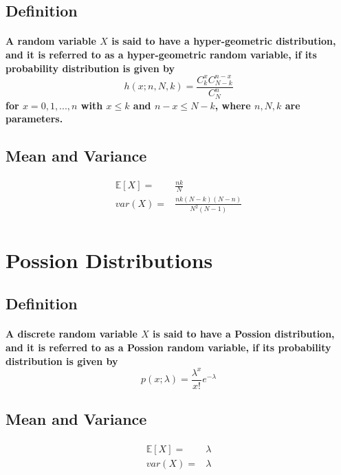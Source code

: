 \documentclass[titlepage]{article}
\begin{document}
        \subsection*{Definition}
            \paragraph{
                A random variable $X$ is said to have a hyper-geometric distribution, and it is referred to as a hyper-geometric random variable, if its probability distribution is given by 
                $$h(x;n,N,k)=\frac{C_k^xC_{N-k}^{n-x}}{C_N^n}$$
                for $x=0,1,...,n$ with $x\leq k$ and $n-x\leq N-k$, where $n,N,k$ are parameters.
            }
        \subsection*{Mean and Variance}  
            \begin{equation*}
                \begin{split}
                    \mathbb{E}[X]=&\frac{nk}{N}\\
                    var(X)=&\frac{nk(N-k)(N-n)}{N^2(N-1)}\\
                \end{split}
            \end{equation*}

    \section{Possion Distributions}
        \subsection*{Definition}
            \paragraph{
                A discrete random variable $X$ is said to have a Possion distribution, and it is referred to as a Possion random variable, if its probability distribution is given by
                $$p(x;\lambda)=\frac{\lambda^x}{x!}e^{-\lambda}$$
            }
        \subsection*{Mean and Variance}  
            \paragraph{
                \begin{equation*}
                    \begin{split}
                        \mathbb{E}[X]=&\lambda\\
                        var(X)=&\lambda
                    \end{split}
                \end{equation*}
            }
\end{document}
